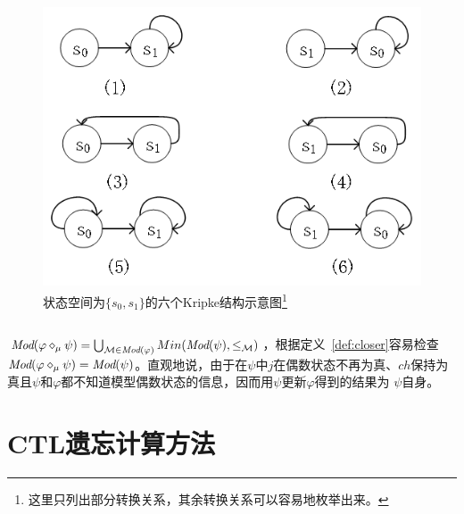 \documentclass[9pt, CJK]{beamer}
\begin{document}
\begin{frame}
{\begin{example}
\begin{columns}
					\begin{figure} 
					\includegraphics[scale=0.4]{figures/knowledge_update}
					\caption{{\tiny 状态空间为$\{s_0,s_1\}$的六个Kripke结构示意图}\footnote{这里只列出部分转换关系，其余转换关系可以容易地枚举出来。}}\label{fig:knoup} 
				\end{figure}
			\end{columns}
			 
			$\textit{Mod}(\varphi \diamond_{\mu} \psi) = \bigcup_{{\cal M}\in \textit{Mod}(\varphi)} Min(\textit{Mod}(\psi), \leq_{{\cal M}})$，根据定义~\ref{def:closer}容易检查$\textit{Mod}(\varphi \diamond_{\mu} \psi) = \textit{Mod}(\psi)$。直观地说，由于在$\psi$中$j$在偶数状态不再为真、$ch$保持为真且$\psi$和$\varphi$都不知道模型偶数状态的信息，因而用$\psi$更新$\varphi$得到的结果为 $\psi$自身。 
		\end{example}
	}
\end{frame}

\section{CTL遗忘计算方法}
\end{document}
